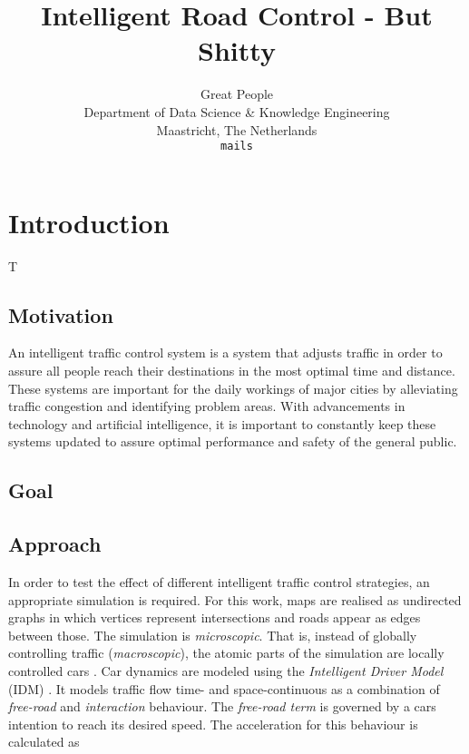 \documentclass[10pt]{article}
\title{Intelligent Road Control - But Shitty}
\author{Great People \\
	Department of Data Science \& Knowledge Engineering\\
	Maastricht, The Netherlands\\
	{\tt mails}
  }
\begin{document}
\maketitle

\begin{abstract}
	
\end{abstract}

\section{Introduction}
T

\subsection{Motivation}
An intelligent traffic control system is a system that adjusts traffic in order to assure all people reach their destinations in the most optimal time and distance.  These systems are important for the daily workings of major cities by alleviating traffic congestion and identifying problem areas.  With advancements in technology and artificial intelligence, it is important to constantly keep these systems updated to assure optimal performance and safety of the general public.

\subsection{Goal}

\subsection{Approach}
In order to test the effect of different intelligent traffic control strategies, an appropriate simulation is required. For this work, maps are realised as undirected graphs in which vertices represent intersections and roads appear as edges between those. The simulation is \textit{microscopic}. That is, instead of globally controlling traffic (\textit{macroscopic}), the atomic parts of the simulation are locally controlled cars \citep[see also][]{krajzewicz2002sumo}. Car dynamics are modeled using the \textit{Intelligent Driver Model} (IDM) \citep{treiber2000congested}. It models traffic flow time- and space-continuous as a combination of \textit{free-road} and \textit{interaction} behaviour. The \textit{free-road term} is governed by a cars intention to reach its desired speed. The acceleration for this behaviour is calculated \citep{treiber2000congested} as
\end{document}
